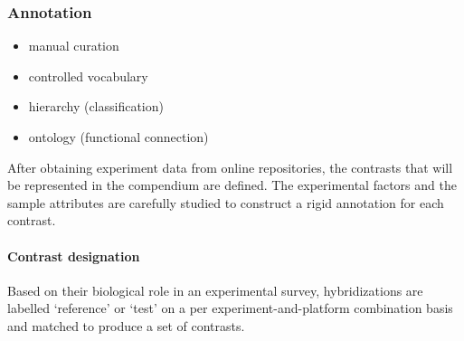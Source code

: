 




\subsubsection{Annotation}

\begin{itemize}
\item manual curation
\item controlled vocabulary
\item hierarchy (classification)
\item ontology (functional connection)
\end{itemize}

%
After obtaining experiment data from online repositories, the contrasts that
will be represented in the compendium are defined.  The experimental factors
and the sample attributes are carefully studied to construct a rigid annotation
for each contrast.
%


\paragraph{Contrast designation}
Based on their biological role in an experimental survey, hybridizations are
labelled `reference' or `test' on a per experiment-and-platform combination
basis and matched to produce a set of contrasts.
%

